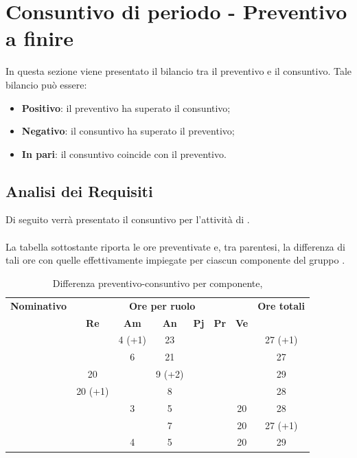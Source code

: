 \section{Consuntivo di periodo - Preventivo a finire}
In questa sezione viene presentato il bilancio tra il preventivo e il consuntivo. Tale bilancio può essere:
\begin{itemize}
	\item \textbf{Positivo}: il preventivo ha superato il consuntivo;
	\item \textbf{Negativo}: il consuntivo ha superato il preventivo;
	\item \textbf{In pari}: il consuntivo coincide con il preventivo.
\end{itemize}

\subsection{Analisi dei Requisiti}
Di seguito verrà presentato il consuntivo per l'attività di \textit{\AdR}.
\\\\
La tabella sottostante riporta le ore preventivate e, tra parentesi, la differenza di tali ore con quelle effettivamente impiegate per ciascun componente del gruppo \gruppo.

\begin{table}[H]
	\begin{center}
		\begin{tabular}{|c|c|c|c|c|c|c|c|}
			\hline
			\textbf{Nominativo} & \multicolumn{6}{c|}{\textbf{Ore per ruolo}} & \textbf{Ore totali} \\
			& \textbf{Re} & \textbf{Am} & \textbf{An} & \textbf{Pj} & \textbf{Pr} & \textbf{Ve} & \\
			\hline	
			\FB		&			&	4 (+1)	&	23		&		&		&		&	27 (+1)	\\
			\hline
			\AF		&			&	6 		&	21		&	 	&		&		& 	27		\\
			\hline
			\GN		&	20		&			&	9 (+2)	&		&		&		&	29		\\
			\hline
			\GR		&	20 (+1)	&	 		&	8 		&		&	 	& 		&	28		\\
			\hline
			\SM 	&			&	3		&	5		&		&		& 	20	&	28		\\
			\hline
			\MP		& 			&			&	7		&		&		&	20	&	27 (+1)	\\
			\hline
			\MV 	&			&	4		&	5		&		&		&	20	& 	29		\\
			\hline
		\end{tabular}
	\end{center}
	\caption{Differenza preventivo-consuntivo per componente, \AdR}
\end{table}



